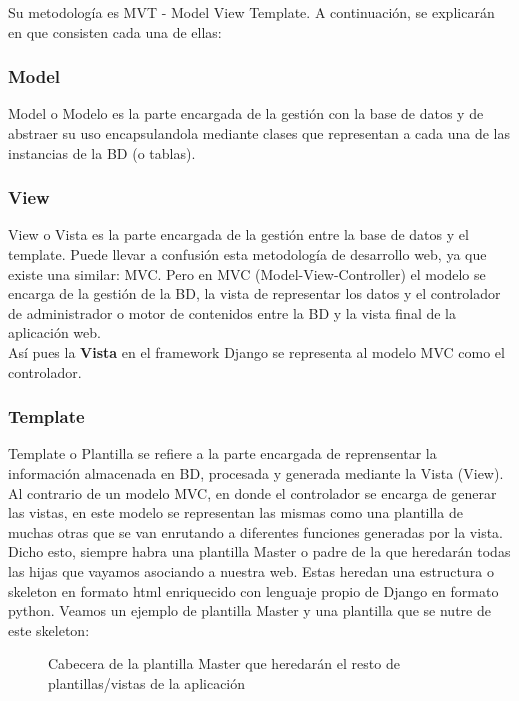 Su metodología es MVT - Model View Template. A continuación, se explicarán en que consisten cada una de ellas:

\subsubsection{Model}

Model o Modelo es la parte encargada de la gestión con la base de datos y de abstraer su uso encapsulandola mediante clases que representan a cada una de las instancias de la BD (o tablas).\\

\subsubsection{View}

View o Vista es la parte encargada de la gestión entre la base de datos y el template. Puede llevar a confusión esta metodología de desarrollo web, ya que existe una similar: MVC. Pero en MVC (Model-View-Controller) el modelo se encarga de la gestión de la BD, la vista de representar los datos y el controlador de administrador o motor de contenidos entre la BD y la vista final de la aplicación web. \\

Así pues la \textbf{Vista} en el framework Django se representa al modelo MVC como el controlador.\\

\subsubsection{Template}

Template o Plantilla se refiere a la parte encargada de reprensentar la información almacenada en BD, procesada y generada mediante la Vista (View). Al contrario de un modelo MVC, en donde el controlador se encarga de generar las vistas, en este modelo se representan las mismas como una plantilla de muchas otras que se van enrutando a diferentes funciones generadas por la vista. \\

Dicho esto, siempre habra una plantilla Master o padre de la que heredarán todas las hijas que vayamos asociando a nuestra web. Estas heredan una estructura o skeleton en formato html enriquecido con lenguaje propio de Django en formato python. Veamos un ejemplo de plantilla Master y una plantilla que se nutre de este skeleton:\\
\begin{figure}[H]
  
  \caption{Cabecera de la plantilla Master que heredarán el resto de plantillas/vistas de la aplicación}
\end{figure}

